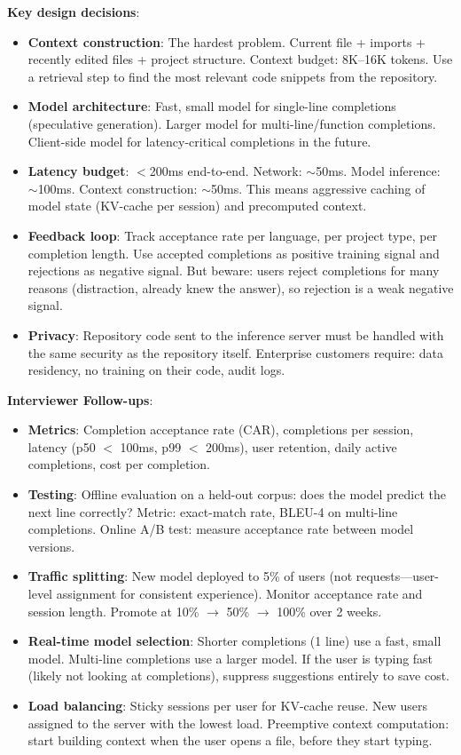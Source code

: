 \textbf{Key design decisions}:
\begin{itemize}[leftmargin=*]
    \item \textbf{Context construction}: The hardest problem. Current file + imports + recently edited files + project structure. Context budget: 8K--16K tokens. Use a retrieval step to find the most relevant code snippets from the repository.
    \item \textbf{Model architecture}: Fast, small model for single-line completions (speculative generation). Larger model for multi-line/function completions. Client-side model for latency-critical completions in the future.
    \item \textbf{Latency budget}: $<$200ms end-to-end. Network: $\sim$50ms. Model inference: $\sim$100ms. Context construction: $\sim$50ms. This means aggressive caching of model state (KV-cache per session) and precomputed context.
    \item \textbf{Feedback loop}: Track acceptance rate per language, per project type, per completion length. Use accepted completions as positive training signal and rejections as negative signal. But beware: users reject completions for many reasons (distraction, already knew the answer), so rejection is a weak negative signal.
    \item \textbf{Privacy}: Repository code sent to the inference server must be handled with the same security as the repository itself. Enterprise customers require: data residency, no training on their code, audit logs.
\end{itemize}

\textbf{Interviewer Follow-ups}:
\begin{itemize}[leftmargin=*]
    \item \textbf{Metrics}: Completion acceptance rate (CAR), completions per session, latency (p50 $<$ 100ms, p99 $<$ 200ms), user retention, daily active completions, cost per completion.
    \item \textbf{Testing}: Offline evaluation on a held-out corpus: does the model predict the next line correctly? Metric: exact-match rate, BLEU-4 on multi-line completions. Online A/B test: measure acceptance rate between model versions.
    \item \textbf{Traffic splitting}: New model deployed to 5\% of users (not requests---user-level assignment for consistent experience). Monitor acceptance rate and session length. Promote at 10\% $\to$ 50\% $\to$ 100\% over 2 weeks.
    \item \textbf{Real-time model selection}: Shorter completions (1 line) use a fast, small model. Multi-line completions use a larger model. If the user is typing fast (likely not looking at completions), suppress suggestions entirely to save cost.
    \item \textbf{Load balancing}: Sticky sessions per user for KV-cache reuse. New users assigned to the server with the lowest load. Preemptive context computation: start building context when the user opens a file, before they start typing.
\end{itemize}

